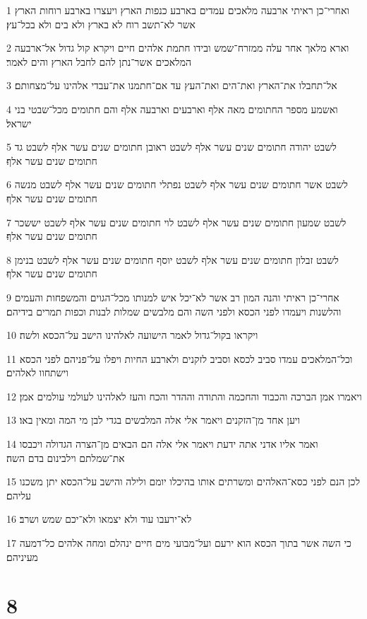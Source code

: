 \par 1 ואחרי־כן ראיתי ארבעה מלאכים עמדים בארבע כנפות הארץ ויעצרו בארבע רוחות הארץ אשר לא־תשב רוח לא בארץ ולא בים ולא בכל־עץ׃
\par 2 וארא מלאך אחר עלה ממזרח־שמש ובידו חתמת אלהים חיים ויקרא קול גדול אל־ארבעה המלאכים אשר־נתן להם לחבל הארץ והים לאמר׃
\par 3 אל־תחבלו את־הארץ ואת־הים ואת־העץ עד אם־חתמנו את־עבדי אלהינו על־מצחותם׃
\par 4 ואשמע מספר החתומים מאה אלף וארבעים וארבעה אלף והם חתומים מכל־שבטי בני ישראל׃
\par 5 לשבט יהודה חתומים שנים עשר אלף לשבט ראובן חתומים שנים עשר אלף לשבט גד חתומים שנים עשר אלף׃
\par 6 לשבט אשר חתומים שנים עשר אלף לשבט נפתלי חתומים שנים עשר אלף לשבט מנשה חתומים שנים עשר אלף׃
\par 7 לשבט שמעון חתומים שנים עשר אלף לשבט לוי חתומים שנים עשר אלף לשבט יששכר חתומים שנים עשר אלף׃
\par 8 לשבט זבלון חתומים שנים עשר אלף לשבט יוסף חתומים שנים עשר אלף לשבט בנימן חתומים שנים עשר אלף׃
\par 9 אחרי־כן ראיתי והנה המון רב אשר לא־יכל איש למנותו מכל־הגוים והמשפחות והעמים והלשנות ויעמדו לפני הכסא ולפני השה והם מלבשים שמלות לבנות וכפות תמרים בידיהם׃
\par 10 ויקראו בקול־גדול לאמר הישועה לאלהינו הישב על־הכסא ולשה׃
\par 11 וכל־המלאכים עמדו סביב לכסא וסביב לזקנים ולארבע החיות ויפלו על־פניהם לפני הכסא וישתחוו לאלהים׃
\par 12 ויאמרו אמן הברכה והכבוד והחכמה והתודה וההדר והכח והעז לאלהינו לעולמי עולמים אמן׃
\par 13 ויען אחד מן־הזקנים ויאמר אלי אלה המלבשים בגדי לבן מי המה ומאין באו׃
\par 14 ואמר אליו אדני אתה ידעת ויאמר אלי אלה הם הבאים מן־הצרה הגדולה ויכבסו את־שמלתם וילבינום בדם השה׃
\par 15 לכן הנם לפני כסא־האלהים ומשרתים אותו בהיכלו יומם ולילה והישב על־הכסא יתן משכנו עליהם׃
\par 16 לא־ירעבו עוד ולא יצמאו ולא־יכם שמש ושרב׃
\par 17 כי השה אשר בתוך הכסא הוא ירעם ועל־מבועי מים חיים ינהלם ומחה אלהים כל־דמעה מעיניהם׃

\chapter{8}

